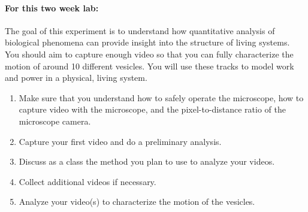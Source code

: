 \paragraph{For this two week lab:} The goal of this experiment is to understand how quantitative analysis of biological phenomena can provide insight into the structure of living systems. You should aim to capture enough video so that you can fully characterize the motion of around 10 different vesicles. You will use these tracks to model work and power in a physical, living system.
\begin{enumerate}
\item Make sure that you understand how to safely operate the microscope, how to capture video with the microscope, and the pixel-to-distance ratio of the microscope camera.
\item Capture your first video and do a preliminary analysis.
\item Discuss as a class the method you plan to use to analyze your videos.
\item Collect additional videos if necessary.
\item Analyze your video(s) to characterize the motion of the vesicles.
\end{enumerate}

